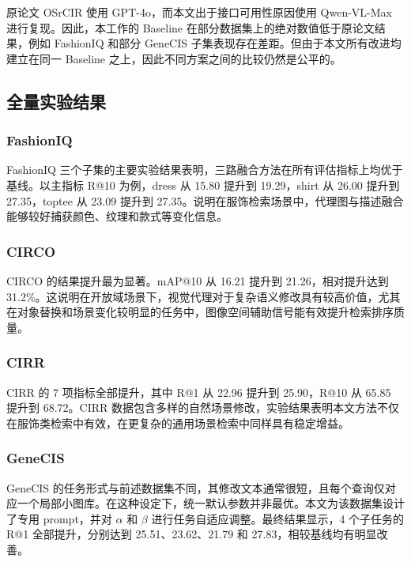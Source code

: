 \documentclass[12pt,a4paper,UTF8,oneside,openany]{ctexrep}
\begin{document}
原论文 OSrCIR 使用 GPT-4o，而本文出于接口可用性原因使用 Qwen-VL-Max
进行复现。因此，本工作的 Baseline
在部分数据集上的绝对数值低于原论文结果，例如 FashionIQ 和部分 GeneCIS
子集表现存在差距。但由于本文所有改进均建立在同一 Baseline
之上，因此不同方案之间的比较仍然是公平的。

\hypertarget{ux5168ux91cfux5b9eux9a8cux7ed3ux679c}{%
\subsection{全量实验结果}\label{ux5168ux91cfux5b9eux9a8cux7ed3ux679c}}

\hypertarget{fashioniq}{%
\subsubsection{FashionIQ}\label{fashioniq}}

FashionIQ
三个子集的主要实验结果表明，三路融合方法在所有评估指标上均优于基线。以主指标
R@10 为例，dress 从 15.80 提升到 19.29，shirt 从 26.00 提升到
27.35，toptee 从 23.09 提升到
27.35。说明在服饰检索场景中，代理图与描述融合能够较好捕获颜色、纹理和款式等变化信息。

\hypertarget{circo}{%
\subsubsection{CIRCO}\label{circo}}

CIRCO 的结果提升最为显著。mAP@10 从 16.21 提升到 21.26，相对提升达到
31.2\%。这说明在开放域场景下，视觉代理对于复杂语义修改具有较高价值，尤其在对象替换和场景变化较明显的任务中，图像空间辅助信号能有效提升检索排序质量。

\hypertarget{cirr}{%
\subsubsection{CIRR}\label{cirr}}

CIRR 的 7 项指标全部提升，其中 R@1 从 22.96 提升到 25.90，R@10 从 65.85
提升到 68.72。CIRR
数据包含多样的自然场景修改，实验结果表明本文方法不仅在服饰类检索中有效，在更复杂的通用场景检索中同样具有稳定增益。

\hypertarget{genecis}{%
\subsubsection{GeneCIS}\label{genecis}}

GeneCIS
的任务形式与前述数据集不同，其修改文本通常很短，且每个查询仅对应一个局部小图库。在这种设定下，统一默认参数并非最优。本文为该数据集设计了专用
prompt，并对 \(\alpha\) 和 \(\beta\) 进行任务自适应调整。最终结果显示，4
个子任务的 R@1 全部提升，分别达到 25.51、23.62、21.79 和
27.83，相较基线均有明显改善。
\end{document}
